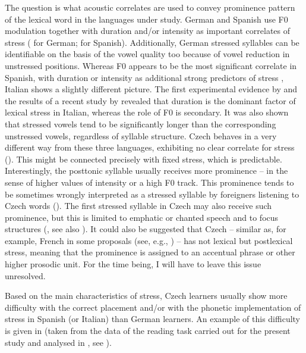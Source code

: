 The question is what acoustic correlates are used to convey prominence pattern of the lexical word in the languages under study. German and Spanish use F0 modulation together with duration and/or intensity as important correlates of stress (\citealt{JessenEtAl1995, Jessen1999, Möbius1993} for German;  \citealt{LlisterriBoix1991, LlisterriBoixEtAl2003, Hualde2014} for Spanish). Additionally, German stressed syllables can be identifiable on the basis of the vowel quality too because of vowel reduction in unstressed positions. Whereas F0 appears to be the most significant correlate in Spanish, with duration or intensity as additional strong predictors of stress \citep[245]{Hualde2005}, Italian shows a slightly different picture. The first experimental evidence by \citet{Bertinetto1981} and the results of a recent study by \citet{ErikssonEtAl2016} revealed that duration is the dominant factor of lexical stress in Italian, whereas the role of F0 is secondary. It was also shown that stressed vowels tend to be significantly longer than the corresponding unstressed vowels, regardless of syllable structure. Czech behaves in a very different way from these three languages, exhibiting no clear correlate for stress (\citealt{Volín2010, SkarnitzlEriksson2017}). This might be connected precisely with fixed stress, which is predictable. Interestingly, the posttonic syllable usually receives more prominence -- in the sense of higher values of intensity or a high F0 track. This prominence tends to be sometimes wrongly interpreted as a stressed syllable by foreigners listening to Czech words (\citealt[147]{SkarnitzlEtAl2016}). The first stressed syllable in Czech may also receive such prominence, but this is limited to emphatic or chanted speech and to focus structures (\citealt{SkarnitzlEtAl2016, PeškováForthcoming}, see also ). It could also be suggested that Czech -- similar as, for example, French in some proposals (see, e.g., \citealt{Jun2005, Delais-RoussarieEtAl2015}) -- has not lexical but postlexical stress, meaning that the prominence is assigned to an accentual phrase or other higher prosodic unit. For the time being, I will have to leave this issue unresolved.



Based on the main characteristics of stress, Czech learners usually show more difficulty with the correct placement and/or with the phonetic implementation of stress in Spanish (or Italian) than German learners. An example of this difficulty is given in  (taken from the data of the reading task carried out for the present study and analysed in \citealt{PeškováEtAl2017}, see ).




